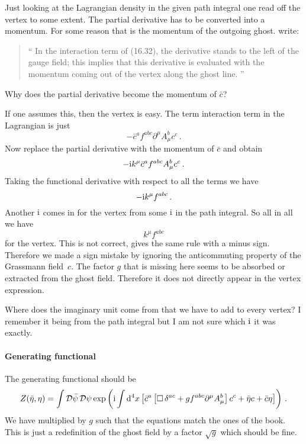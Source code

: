 \documentclass[11pt, english, fleqn, DIV=15, headinclude]{scrartcl}
\begin{document}
Just looking at the Lagrangian density in the given path integral one read off
the vertex to some extent. The partial derivative has to be converted into a
momentum. For some reason that is the momentum of the outgoing ghost.
\Textcite[514]{Peskin/QFT/1995} write:

\begin{quote}
    \enquote{%
        In the interaction term of (16.32), the derivative stands to the left
        of the gauge field; this implies that this derivative is evaluated with
        the momentum coming out of the vertex along the ghost line.%
    }
\end{quote}

    \begin{question}
        Why does the partial derivative become the momentum of $\bar c$?
    \end{question}

If one assumes this, then the vertex is easy. The term interaction term in the
Lagrangian is just
\[
    - \bar c^a f^{abc} \partial^\mu A^b_\mu c^c \,.
\]
Now replace the partial derivative with the momentum of $\bar c$ and obtain
\[
    - \mathrm i k^\mu \bar c^a f^{abc} A^b_\mu c^c \,.
\]
Taking the functional derivative with respect to all the terms we have
\[
    - \mathrm i k^\mu f^{abc} \,.
\]
Another $\mathrm i$ comes in for the vertex from some $\mathrm i$ in the path integral.
So all in all we have
\[
    k^\mu f^{abc}
\]
for the vertex. This is not correct, \textcite[Figure~16.5]{Peskin/QFT/1995}
gives the same rule with a minus sign. Therefore we made a sign mistake by
ignoring the anticommuting property of the Grassmann field~$c$. The factor $g$
that is missing here seems to be absorbed or extracted from the ghost field.
Therefore it does not directly appear in the vertex expression.

    \begin{question}
        Where does the imaginary unit come from that we have to add to every
        vertex? I remember it being from the path integral but I am not sure
        which $\mathrm i$ it was exactly.
    \end{question}

\paragraph{Generating functional}

The generating functional should be
\[
    Z(\bar\eta, \eta) =
    \int \mathcal D \bar\psi \, \mathcal D \psi
    \exp\left( 
        \mathrm i \int \mathop{}\!\mathrm d^4 x \left[ 
            \bar c^a \left[ 
                \operatorname{\Box} \delta^{ac} + g f^{abc} \partial^\mu A_\mu^b  
             \right] c^c
            + \bar\eta c
            + \bar c \eta
         \right]
     \right) \,.
\]
We have multiplied by $g$ such that the equations match the ones of the book.
This is just a redefinition of the ghost field by a factor $\sqrt g$ which
should be fine.
\end{document}
